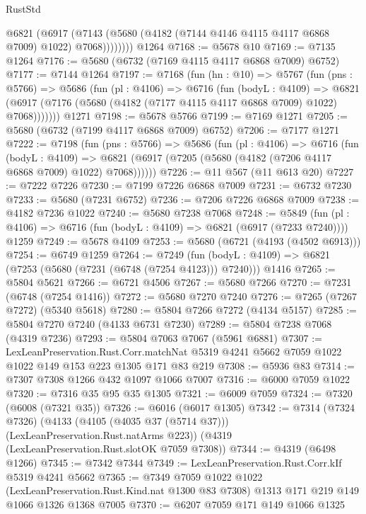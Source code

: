 \begin{lexlean}{RustStd}
\begin{coremodule}
            @6821
              (@6917 (@7143 (@5680 (@4182 (@7144 @4146 @4115 @4117 @6868 @7009) @1022) @7068))))))))
    @1264
@7168 := @5678 @10
@7169 := @7135 @1264
@7176 := @5680 (@6732 (@7169 @4115 @4117 @6868 @7009) @6752)
@7177 := @7144 @1264
@7197 := @7168
    (fun (hn : @10) =>
    @5767
      (fun (pns : @5766) =>
      @5686
        (fun (pl : @4106) =>
        @6716
          (fun (bodyL : @4109) =>
          @6821 (@6917 (@7176 (@5680 (@4182 (@7177 @4115 @4117 @6868 @7009) @1022) @7068)))))))
    @1271
@7198 := @5678 @5766
@7199 := @7169 @1271
@7205 := @5680 (@6732 (@7199 @4117 @6868 @7009) @6752)
@7206 := @7177 @1271
@7222 := @7198
    (fun (pns : @5766) =>
    @5686
      (fun (pl : @4106) =>
      @6716
        (fun (bodyL : @4109) =>
        @6821 (@6917 (@7205 (@5680 (@4182 (@7206 @4117 @6868 @7009) @1022) @7068))))))
@7226 := @11 @567 (@11 @613 @20)
@7227 := @7222 @7226
@7230 := @7199 @7226 @6868 @7009
@7231 := @6732 @7230
@7233 := @5680 (@7231 @6752)
@7236 := @7206 @7226 @6868 @7009
@7238 := @4182 @7236 @1022
@7240 := @5680 @7238 @7068
@7248 := @5849
    (fun (pl : @4106) => @6716 (fun (bodyL : @4109) => @6821 (@6917 (@7233 @7240))))
    @1259
@7249 := @5678 @4109
@7253 := @5680 (@6721 (@4193 (@4502 @6913)))
@7254 := @6749 @1259
@7264 := @7249
    (fun (bodyL : @4109) => @6821 (@7253 (@5680 (@7231 (@6748 (@7254 @4123))) @7240)))
    @1416
@7265 := @5804 @5621
@7266 := @6721 @4506
@7267 := @5680 @7266
@7270 := @7231 (@6748 (@7254 @1416))
@7272 := @5680 @7270 @7240
@7276 := @7265 (@7267 @7272) (@5340 @5618)
@7280 := @5804 @7266 @7272 (@4134 @5157)
@7285 := @5804 @7270 @7240 (@4133 @6731 @7230)
@7289 := @5804 @7238 @7068 (@4319 @7236)
@7293 := @5804 @7063 @7067 (@5961 @6881)
@7307 := LexLeanPreservation.Rust.Corr.matchNat
    @5319
    @4241
    @5662
    @7059
    @1022
    @1022
    @149
    @153
    @223
    @1305
    @171
    @83
    @219
@7308 := @5936 @83
@7314 := @7307 @7308 @1266 @432 @1097 @1066 @7007
@7316 := @6000 @7059 @1022
@7320 := @7316 @35 @95 @35 @1305
@7321 := @6009 @7059
@7324 := @7320 (@6008 (@7321 @35))
@7326 := @6016 (@6017 @1305)
@7342 := @7314
    (@7324 @7326)
    (@4133 (@4105 (@4035 @37 (@5714 @37))) (LexLeanPreservation.Rust.natArms @223))
    (@4319 (LexLeanPreservation.Rust.slotOK @7059 @7308))
@7344 := @4319 (@6498 @1266)
@7345 := @7342 @7344
@7349 := LexLeanPreservation.Rust.Corr.kIf @5319 @4241 @5662
@7365 := @7349
    @7059
    @1022
    @1022
    (LexLeanPreservation.Rust.Kind.nat @1300 @83 @7308)
    @1313
    @171
    @219
    @149
    @1066
    @1326
    @1368
    @7005
@7370 := @6207 @7059 @171 @149 @1066 @1325

\end{coremodule}
\end{lexlean}
